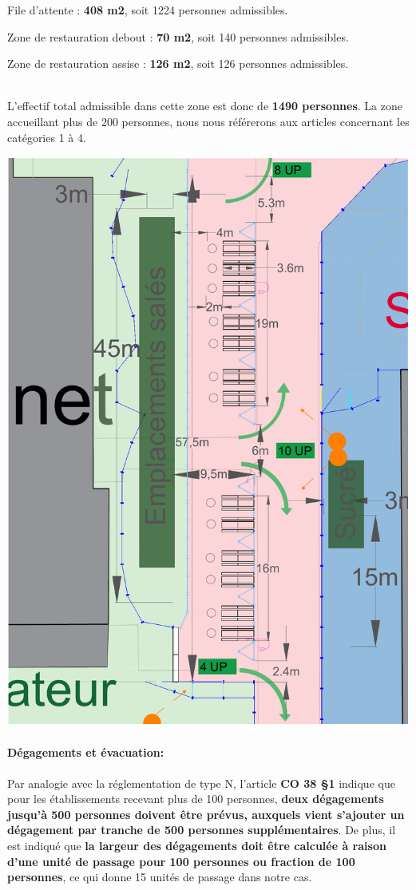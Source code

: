 \documentclass[hidelinks, paper=a4, fontsize=13pt]{report}
\begin{document}
\begin{list}{•}{}
	\item File d'attente : \textbf{408 m2}, soit 1224 personnes admissibles.
	\item Zone de restauration debout : \textbf{70 m2}, soit 140 personnes admissibles.
	\item Zone de restauration assise : \textbf{126 m2}, soit 126 personnes admissibles.
\end{list} \mbox{}\\

L'effectif total admissible dans cette zone est donc de \textbf{1490 personnes}. La zone accueillant plus de 200 personnes, nous nous référerons aux articles concernant les catégories 1 à 4. \\

\begin{center}
	\includegraphics[width=.8\textwidth,keepaspectratio]{Exports/Plan_24h_44eme-Espace_Resto_Cotes}
\end{center}

\paragraph{Dégagements et évacuation:}
Par analogie avec la réglementation de type N, l’article \textbf{CO 38 §1} indique que pour les établissements recevant plus de 100 personnes, \textbf{deux dégagements jusqu’à 500 personnes doivent être prévus, auxquels vient s'ajouter un dégagement par tranche de 500 personnes supplémentaires}. De plus, il est indiqué que \textbf{la largeur des dégagements doit être calculée à raison d'une unité de passage pour 100 personnes ou fraction de 100 personnes}, ce qui donne 15 unités de passage dans notre cas. \\
\end{document}

